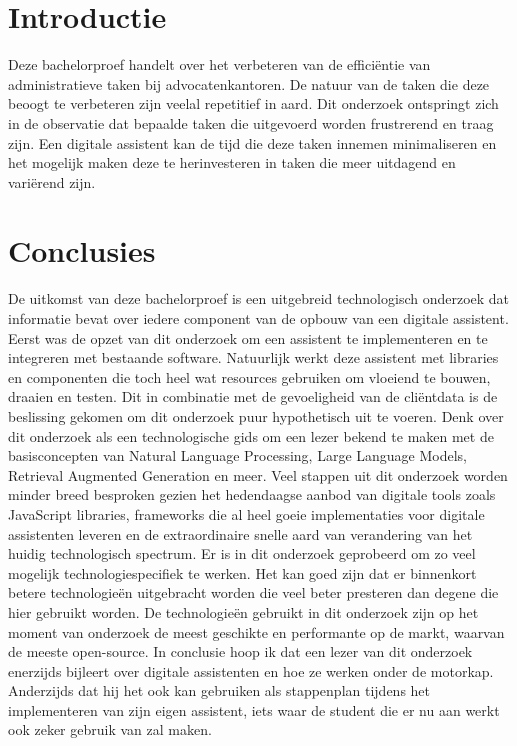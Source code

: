 \documentclass[a0,portrait]{hogent-poster}
\begin{document}
\begin{multicols}{2} %

	\section{Introductie}
	Deze bachelorproef handelt over het verbeteren van de efficiëntie van administratieve taken bij advocatenkantoren. 
    De natuur van de taken die deze beoogt te verbeteren zijn veelal repetitief in aard. Dit onderzoek ontspringt zich in de observatie
	dat bepaalde taken die uitgevoerd worden frustrerend en traag zijn. Een digitale
	assistent kan de tijd die deze taken innemen minimaliseren en het mogelijk maken
	deze te herinvesteren in taken die meer uitdagend en variërend zijn.

	\section{Conclusies}
	De uitkomst van deze bachelorproef is een uitgebreid technologisch onderzoek dat
	informatie bevat over iedere component van de opbouw van een digitale assistent.
	Eerst was de opzet van dit onderzoek om een assistent te implementeren en te
	integreren met bestaande software.
	Natuurlijk werkt deze assistent met libraries en componenten die toch heel wat
	resources gebruiken om vloeiend te bouwen, draaien en testen. Dit in combinatie
	met de gevoeligheid van de cliëntdata is de beslissing gekomen om dit onderzoek
	puur hypothetisch uit te voeren. Denk over dit onderzoek als een technologische
	gids om een lezer bekend te maken met de basisconcepten van Natural Language
	Processing, Large Language Models, Retrieval Augmented Generation en meer.
	Veel stappen uit dit onderzoek worden minder breed besproken gezien het hedendaagse aanbod van 
    digitale tools zoals JavaScript libraries, frameworks die al heel
	goeie implementaties voor digitale assistenten leveren en de extraordinaire snelle
	aard van verandering van het huidig technologisch spectrum.
	Er is in dit onderzoek geprobeerd om zo veel mogelijk technologiespecifiek te werken. 
    Het kan goed zijn dat er binnenkort betere technologieën uitgebracht worden
	die veel beter presteren dan degene die hier gebruikt worden. De technologieën
	gebruikt in dit onderzoek zijn op het moment van onderzoek de meest geschikte
	en performante op de markt, waarvan de meeste open-source.
	In conclusie hoop ik dat een lezer van dit onderzoek enerzijds bijleert over digitale
	assistenten en hoe ze werken onder de motorkap. Anderzijds dat hij het ook kan
	gebruiken als stappenplan tijdens het implementeren van zijn eigen assistent, iets
	waar de student die er nu aan werkt ook zeker gebruik van zal maken.


\end{multicols}
\end{document}
